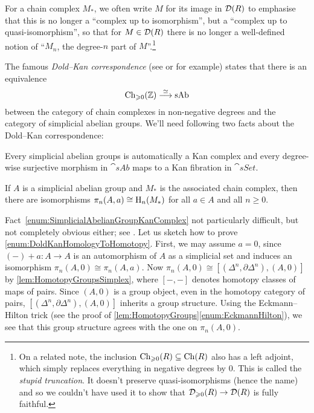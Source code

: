 	For a chain complex $M_*$, we often write $M$ for its image in $\mathcal{D}(R)$ to emphasise that this is no longer a \enquote{complex up to isomorphism}, but a \enquote{complex up to quasi-isomorphism}, so that for $M\in\mathcal{D}(R)$ there is no longer a well-defined notion of \enquote{$M_n$, the degree-$n$ part of $M$}.\footnote{On a related note, the inclusion $\operatorname{Ch}_{\geqslant 0}(R)\subseteq \operatorname{Ch}(R)$ also has a left adjoint, which simply replaces everything in negative degrees by $0$. This is called the \emph{stupid truncation}. It doesn't preserve quasi-isomorphisms (hence the name) and so we couldn't have used it to show that $\mathcal{D}_{\geqslant 0}(R)\rightarrow \mathcal{D}(R)$ is fully faithful.}
\begin{numpar}\label{con:DerivedCategoryII}
	The famous \emph{Dold--Kan correspondence} (see \cite[Theorem~]{HA} or \cite[\S \href{http://dodo.pdmi.ras.ru/~topology/books/goerss-jardine.pdf\#page=169}{III.2}]{GoerssJardine} for example) states that there is an equivalence
	\begin{equation*}
		\operatorname{Ch}_{\geqslant 0}(\mathbb{Z})\overset{\simeq}{\longrightarrow}\mathrm{sAb}
	\end{equation*}
	between the category of chain complexes in non-negative degrees and the category of simplicial abelian groups. We'll need following two facts about the Dold--Kan correspondence:
	\begin{alphanumerate}\itshape
		\item Every simplicial abelian groups is automatically a Kan complex and every degree-wise surjective morphism in $\cat{sAb}$ maps to a Kan fibration in $\cat{sSet}$.\label{enum:SimplicialAbelianGroupKanComplex}
		\item If $A$ is a simplicial abelian group and $M_*$ is the associated chain complex, then there are isomorphisms $\pi_n(A,a)\cong \mathrm{H}_n(M_*)$ for all $a\in A$ and all $n\geqslant 0$.\label{enum:DoldKanHomologyToHomotopy}
	\end{alphanumerate}
	Fact~\cref{enum:SimplicialAbelianGroupKanComplex} not particularly difficult, but not completely obvious either; see \cite[Tags~\href{https://stacks.math.columbia.edu/tag/08NZ}{08NZ} and~\href{https://stacks.math.columbia.edu/tag/08P0}{08P0}]{Stacks}. Let us sketch how to prove \cref{enum:DoldKanHomologyToHomotopy}. First, we may assume $a=0$, since $(-)+a\colon A\rightarrow A$ is an automorphism of $A$ as a simplicial set and induces an isomorphism $\pi_n(A,0)\cong \pi_n(A,a)$. Now $\pi_n(A,0)\cong [(\Delta^n,\partial\Delta^n),(A,0)]$ by \cref{lem:HomotopyGroupsSimplex}, where $[-,-]$ denotes homotopy classes of maps of pairs. Since $(A,0)$ is a group object, even in the homotopy category of pairs, $[(\Delta^n,\partial\Delta^n),(A,0)]$ inherits a group structure. Using the Eckmann--Hilton trick (see the proof of \cref{lem:HomotopyGroups}\cref{enum:EckmannHilton}), we see that this group structure agrees with the one on $\pi_n(A,0)$.
	

\end{numpar}

